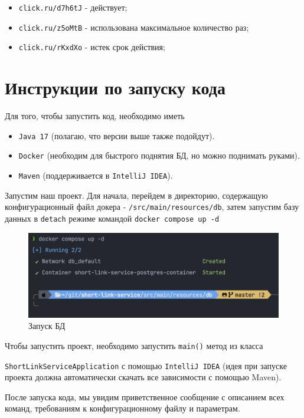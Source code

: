 \documentclass[a4paper, 14pt]{article}
\begin{document}
\begin{itemize}
	\item \texttt{click.ru/d7h6tJ} - действует;
	\item \texttt{click.ru/z5oMtB} - использована максимальное количество раз;
	\item \texttt{click.ru/rKxdXo} - истек срок действия;
\end{itemize}

\newpage
\section{Инструкции по запуску кода}

Для того, чтобы запустить код, необходимо иметь

\begin{itemize}
	\item \texttt{Java 17} (полагаю, что версии выше также подойдут).
	\item \texttt{Docker} (необходим для быстрого поднятия БД, но можно поднимать руками).
	\item \texttt{Maven} (поддерживается в \texttt{IntelliJ IDEA}).
\end{itemize}

Запустим наш проект. Для начала, перейдем в директорию, содержащую конфигурационный файл докера - \texttt{/src/main/resources/db}, затем запустим базу данных в \texttt{detach} режиме командой \texttt{docker compose up -d}

\begin{figure}[H]
	\centering
	\includegraphics[width=17cm]{resources/1.png}
	\caption{Запуск БД}
\end{figure}

Чтобы запустить проект, необходимо запустить \texttt{main()} метод из класса

\texttt{ShortLinkServiceApplication} с помощью \texttt{IntelliJ IDEA} (идея при запуске проекта должна автоматически скачать все зависимости с помощью Maven).


После запуска кода, мы увидим приветственное сообщение с описанием всех команд, требованиям к конфигурационному файлу и параметрам.
\end{document}
